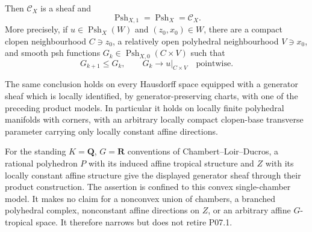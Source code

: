 Then \(\mathscr C_X\) is a sheaf and
\begin{equation}
             \operatorname{Psh}_{X,1}
             =\operatorname{Psh}_X
             =\mathscr C_X.
 \label{eq:p071-polyhedral-collapse}
\end{equation}
More precisely, if \(u\in\operatorname{Psh}_X(W)\) and
\((z_0,x_0)\in W\), there are a compact clopen neighbourhood
\(C\ni z_0\), a relatively open polyhedral neighbourhood \(V\ni x_0\),
and smooth psh functions \(G_k\in\operatorname{Psh}_{X,0}(C\times V)\)
such that
\begin{equation}
                         G_{k+1}\leq G_k,
             \qquad      G_k\longrightarrow u|_{C\times V}
             \quad\text{pointwise}.
 \label{eq:p071-polyhedral-fixed-domain}
\end{equation}

The same conclusion holds on every Hausdorff space equipped with a
generator sheaf which is locally identified, by generator-preserving
charts, with one of the preceding product models.  In particular it holds
on locally finite polyhedral manifolds with corners, with an arbitrary
locally compact clopen-base transverse parameter carrying only locally
constant affine directions.

For the standing \(K=\mathbf Q\), \(G=\mathbf R\) conventions of
Chambert--Loir--Ducros, a rational polyhedron \(P\) with its induced
affine tropical structure and \(Z\) with its locally constant affine
structure give the displayed generator sheaf through their product
construction.  The assertion is confined to this convex single-chamber
model.  It makes no claim for a nonconvex union of chambers, a branched
polyhedral complex, nonconstant affine directions on \(Z\), or an
arbitrary affine \(G\)-tropical space.  It therefore narrows but does not
retire P07.1.
